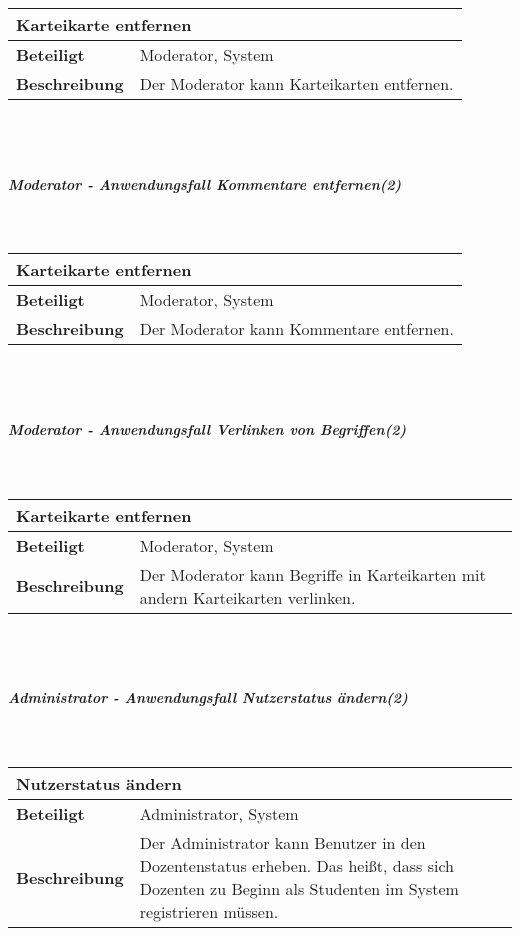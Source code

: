 \documentclass[12pt,a4paper]{article}
\begin{document}
\begin{tabular}{l p{10cm}}
\multicolumn{2}{l}{\textbf{Karteikarte entfernen}} \\ \hline
\textbf{Beteiligt} & Moderator, System \\ \hline 
\textbf{Beschreibung} & Der Moderator kann Karteikarten entfernen.\\ 
\hline 
\end{tabular}\\\\
\subparagraph{Moderator - Anwendungsfall \glqq Kommentare entfernen\grqq (2)}\mbox{}\\

\begin{tabular}{l p{10cm}}
\multicolumn{2}{l}{\textbf{Karteikarte entfernen}} \\ \hline
\textbf{Beteiligt} & Moderator, System \\ \hline 
\textbf{Beschreibung} & Der Moderator kann Kommentare entfernen.\\ 
\hline 
\end{tabular}\\\\
\subparagraph{Moderator - Anwendungsfall \glqq Verlinken von Begriffen\grqq (2)}\mbox{}\\

\begin{tabular}{l p{10cm}}
\multicolumn{2}{l}{\textbf{Karteikarte entfernen}} \\ \hline
\textbf{Beteiligt} & Moderator, System \\ \hline 
\textbf{Beschreibung} & Der Moderator kann Begriffe in Karteikarten mit andern Karteikarten verlinken.\\ 
\hline 
\end{tabular}\\\\
\subparagraph{Administrator - Anwendungsfall \glqq Nutzerstatus ändern\grqq (2)}\mbox{}\\

\begin{tabular}{l p{10cm}}
\multicolumn{2}{l}{\textbf{Nutzerstatus ändern}} \\ \hline
\textbf{Beteiligt} & Administrator, System \\ \hline 
\textbf{Beschreibung} & Der Administrator kann Benutzer in den Dozentenstatus erheben. Das heißt, dass sich Dozenten zu Beginn als Studenten im System registrieren müssen.\\ 
\hline 
\end{tabular}\\\\
\end{document}
